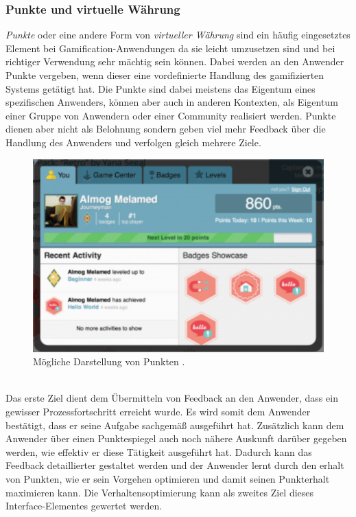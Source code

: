 \documentclass[a4paper,12pt]{scrartcl}
\begin{document}
\subsubsection{Punkte und virtuelle Währung}
\textit{Punkte} oder eine andere Form von \textit{virtueller Währung} sind ein häufig eingesetztes Element bei Gamification-Anwendungen da sie leicht umzusetzen sind und bei richtiger Verwendung sehr mächtig sein können. Dabei werden an den Anwender Punkte vergeben, wenn dieser eine vordefinierte Handlung des gamifizierten Systems getätigt hat. Die Punkte sind dabei meistens das Eigentum eines spezifischen Anwenders, können aber auch in anderen Kontexten, als Eigentum einer Gruppe von Anwendern oder einer Community realisiert werden. Punkte dienen aber nicht als Belohnung sondern geben viel mehr Feedback über die Handlung des Anwenders und verfolgen gleich mehrere Ziele.
\\
\begin{figure}[h!]
\begin{center}
\includegraphics[scale = 0.7]{Bilder/Points.eps}
\caption{Mögliche Darstellung von Punkten \cite{Points}.}
\label{PointsBild}
\end{center}
\end{figure} 
\\
Das erste Ziel dient dem Übermitteln von Feedback an den Anwender, dass ein gewisser Prozessfortschritt erreicht wurde. Es wird somit dem Anwender bestätigt, dass er seine Aufgabe sachgemäß ausgeführt hat. Zusätzlich kann dem Anwender über einen Punktespiegel auch noch nähere Auskunft darüber gegeben werden, wie effektiv er diese Tätigkeit ausgeführt hat. Dadurch kann das Feedback detaillierter gestaltet werden und der Anwender lernt durch den erhalt von Punkten, wie er sein Vorgehen optimieren und damit seinen Punkterhalt maximieren kann. Die Verhaltensoptimierung kann als zweites Ziel dieses Interface-Elementes gewertet werden.
\end{document}
